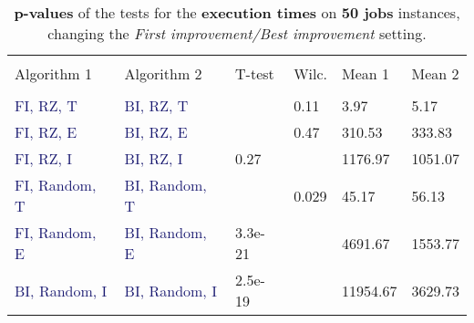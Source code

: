 \documentclass[
12pt,
a4paper,
oneside,
headinclude,
footinclude]{article}
\theoremstyle{definition} %
\begin{document}
\begin{table}[H]
    \begin{tabular}{l l l l l l} %
        \hline
        \hline 
        \\[-1.5ex]
        \textcolor{BrickRed}{Algorithm 1} & \textcolor{BrickRed}{Algorithm 2} & \textcolor{BrickRed}{T-test} & \textcolor{BrickRed}{Wilc.} & \textcolor{BrickRed}{Mean 1} & \textcolor{BrickRed}{Mean 2}\\ [0.5ex]
        \hline %
        \\[-1.5ex]
        \textcolor{MidnightBlue}{FI, RZ, T}     & \textcolor{MidnightBlue}{BI, RZ, T}     &  & 0.11 &   3.97 & 5.17 \\ 
        \textcolor{MidnightBlue}{FI, RZ, E}     & \textcolor{MidnightBlue}{BI, RZ, E}     &  & 0.47 &   310.53 & 333.83 \\ 
        \textcolor{MidnightBlue}{FI, RZ, I}     & \textcolor{MidnightBlue}{BI, RZ, I}     & 0.27 &  &  1176.97 & 1051.07 \\ 
        \textcolor{MidnightBlue}{FI, Random, T} & \textcolor{MidnightBlue}{BI, Random, T} &  & 0.029 &  45.17 & 56.13 \\ 
        \textcolor{MidnightBlue}{FI, Random, E} & \textcolor{MidnightBlue}{BI, Random, E} & 3.3e-21 &  &  4691.67 & 1553.77 \\ 
        \textcolor{MidnightBlue}{BI, Random, I} & \textcolor{MidnightBlue}{BI, Random, I} & 2.5e-19 &  &  11954.67 & 3629.73 \\ 
        [1ex] %
        \hline %
    \end{tabular}
    \caption{\label{tab:ii-ty50ex}\textbf{p-values} of the tests for the \textbf{execution times} on \textbf{50 jobs} instances, changing the \textit{First improvement/Best improvement} setting.}
\end{table} 
\end{document}
